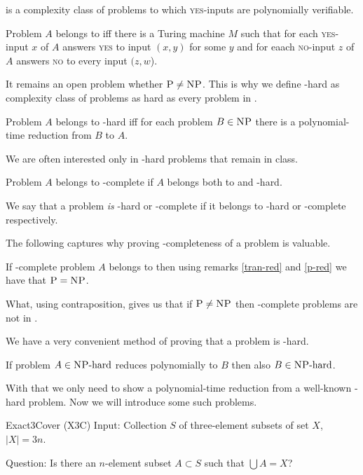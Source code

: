 \np is a complexity class of problems to which \textsc{yes}-inputs are polynomially verifiable.

\begin{defn}[\np]
Problem $A$ belongs to \np iff there is a Turing machine $M$ such that
for each \textsc{yes}-input $x$ of $A$ answers \textsc{yes} to input $(x,y)$ for some $y$
and for eaach \textsc{no}-input $z$ of $A$ answers \textsc{no} to every input $(z,w$).
\end{defn}

It remains an open problem whether $\text{\textsc{P}}\neq\text{\textsc{NP}}$.
This is why we define \np-hard as complexity class of problems as hard as every problem in \np.

\begin{defn}[\np-hard]
Problem $A$ belongs to \np-hard iff for each problem $B \in \text{\textsc{NP}}$
there is a polynomial-time reduction from $B$ to $A$.
\end{defn}

We are often interested only in \np-hard problems that remain in \np class.

\begin{defn}[\np-complete]
Problem $A$ belongs to \np-complete if $A$ belongs both to \np and \np-hard.
\end{defn}

We say that a problem \textit{is} \np-hard or \np-complete if it belongs to \np-hard or \np-complete respectively.

The following captures why proving \np-completeness of a problem is valuable.

\begin{rmrk}
If \np-complete problem $A$ belongs to \p then using remarks \ref{tran-red} and \ref{p-red}
we have that $\text{\textsc{P}} = \text{\textsc{NP}}$.
\end{rmrk}

What, using contraposition, gives us that if $\text{\textsc{P}} \neq \text{\textsc{NP}}$ then \np-complete problems are not in \p.

We have a very convenient method of proving that a problem is \np-hard.

\begin{rmrk}
If problem $A \in \text{\text{\textsc{NP}}-hard}$ reduces polynomially to $B$ then also $B \in \text{\text{\textsc{NP}}-hard}$.
\end{rmrk}

With that we only need to show a polynomial-time reduction from a well-known \np-hard problem.
Now we will introduce some such problems.

\begin{problem}{Exact3Cover (X3C)}
	Input: Collection $S$ of three-element subsets of set $X$, $\vert{X}\vert = 3n$.

	Question: Is there an $n$-element subset $A \subset S$ such that $\bigcup A = X$?
\end{problem}

